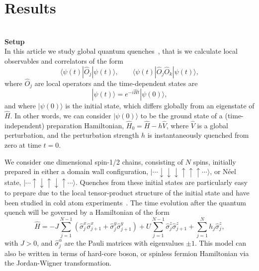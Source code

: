 \documentclass[twocolumn,showpacs,preprintnumbers,nofootinbib,amsmath,aps,pra,longbibliography,amssymb,superscriptaddress]{revtex4-1}
\newcommand{\la}{\langle}
\newcommand{\ra}{\rangle}
\begin{document}
\section*{Results}


\hfill\\\textbf{Setup}\\
In this article we study global quantum quenches~\cite{Essler2016,Vasseur2016}, that is we calculate local observables and correlators of the form
\begin{equation}\label{eq: observables}
\la \psi (t) | \hat{O}_j | \psi(t) \ra, \qquad \la \psi (t) | \hat{O}_j \hat{O}_k | \psi(t) \ra,
\end{equation}
where $\hat{O}_j$ are local operators and the time-dependent states are
\begin{equation}
|\psi(t) \ra = e^{-i \hat{H} t} |\psi(0)\ra,
\end{equation}
and where $|\psi(0)\ra$ is the initial state, which differs globally from an eigenstate of $\hat{H}$. In other words, we can consider $|\psi(0)\ra$ to be the ground state of a (time-independent) preparation Hamiltonian, $\hat{H}_0 = \hat{H} - h\hat{V}$, where $\hat{V}$ is a global perturbation, and the perturbation strength $h$ is instantaneously quenched from zero at time $t=0$.

We consider one dimensional spin-1/2 chains, consisting of $N$ spins, initially prepared in either a domain wall configuration, $|\cdots \!\downarrow \downarrow \downarrow \uparrow \uparrow \uparrow \!\cdots \ra$, or N{\'e}el state, $| \cdots \!\uparrow \downarrow \uparrow \downarrow \uparrow \!\cdots \ra$. Quenches from these initial states are particularly easy to prepare due to the local tensor-product structure of the initial state and have been studied in cold atom experiments~\cite{Schreiber2015}. The time evolution after the quantum quench will be governed by a Hamiltonian of the form
\begin{equation}\label{eq: H}
\hat{H} = - J\sum_{j=1}^{N-1} \left(\hat{\sigma}^x_j\hat{\sigma}^x_{j+1} + \hat{\sigma}^y_j \hat{\sigma}^y_{j+1}\right) + U \sum_{j=1}^{N-1} \hat{\sigma}^z_j \hat{\sigma}^z_{j+1} + \sum_{j=1}^N h_j \hat{\sigma}^z_j,
\end{equation}
with $J>0$, and $\hat{\sigma}^\alpha_j$ are the Pauli matrices with eigenvalues $\pm 1$. This model can also be written in terms of hard-core boson, or spinless fermion Hamiltonian via the Jordan-Wigner transformation. 
\end{document}
